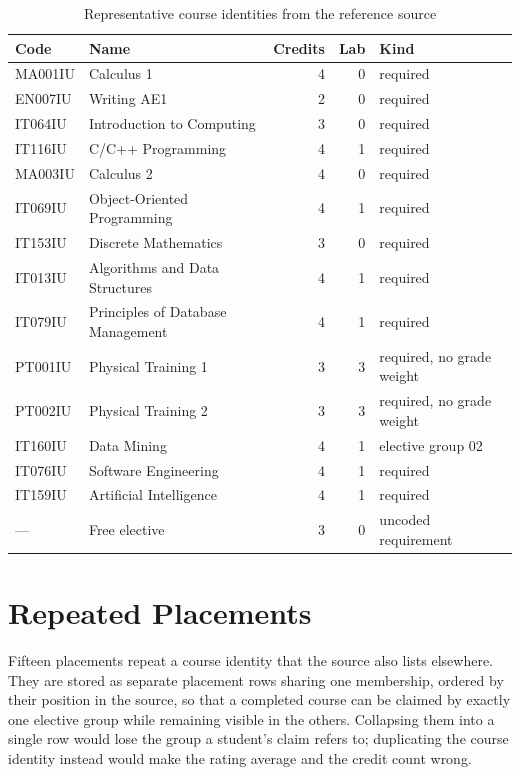 \begin{table}[h]
\centering
\small
\begin{tabular}{llrrl}
\toprule
\textbf{Code} & \textbf{Name} & \textbf{Credits} & \textbf{Lab} & \textbf{Kind} \\
\midrule
MA001IU & Calculus 1                          & 4 & 0 & required \\
EN007IU & Writing AE1                         & 2 & 0 & required \\
IT064IU & Introduction to Computing           & 3 & 0 & required \\
IT116IU & C/C++ Programming                   & 4 & 1 & required \\
MA003IU & Calculus 2                          & 4 & 0 & required \\
IT069IU & Object-Oriented Programming         & 4 & 1 & required \\
IT153IU & Discrete Mathematics                & 3 & 0 & required \\
IT013IU & Algorithms and Data Structures      & 4 & 1 & required \\
IT079IU & Principles of Database Management   & 4 & 1 & required \\
PT001IU & Physical Training 1                 & 3 & 3 & required, no grade weight \\
PT002IU & Physical Training 2                 & 3 & 3 & required, no grade weight \\
IT160IU & Data Mining                         & 4 & 1 & elective group 02 \\
IT076IU & Software Engineering                & 4 & 1 & required \\
IT159IU & Artificial Intelligence             & 4 & 1 & required \\
---     & Free elective                       & 3 & 0 & uncoded requirement \\
\bottomrule
\end{tabular}
\caption{Representative course identities from the reference source}
\end{table}

\section{Repeated Placements}

Fifteen placements repeat a course identity that the source also lists elsewhere. They are stored as
separate placement rows sharing one membership, ordered by their position in the source, so that a
completed course can be claimed by exactly one elective group while remaining visible in the others.
Collapsing them into a single row would lose the group a student's claim refers to; duplicating the
course identity instead would make the rating average and the credit count wrong.
